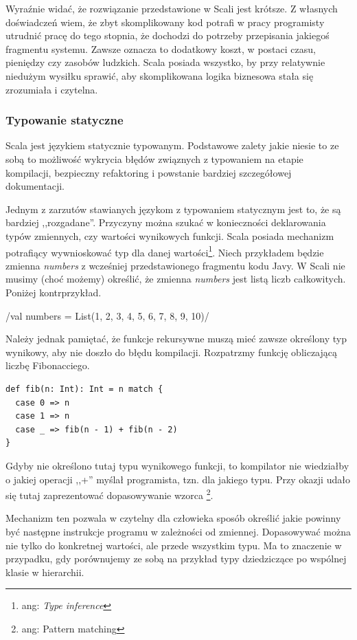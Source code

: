 \documentclass[brudnopis]{xmgr}
\begin{document}
Wyraźnie widać, że rozwiązanie przedstawione w Scali jest krótsze. Z własnych doświadczeń wiem, że zbyt skomplikowany kod potrafi w pracy programisty utrudnić pracę do tego stopnia, że dochodzi do potrzeby przepisania jakiegoś fragmentu systemu. Zawsze oznacza to dodatkowy koszt, w postaci czasu, pieniędzy czy zasobów ludzkich. Scala posiada wszystko, by przy relatywnie niedużym wysiłku sprawić, aby skomplikowana logika biznesowa stała się zrozumiała i czytelna.

\subsubsection{Typowanie statyczne}

Scala jest językiem statycznie typowanym. Podstawowe zalety jakie niesie to ze sobą to możliwość wykrycia błędów związnych z typowaniem na etapie kompilacji, bezpieczny refaktoring i powstanie bardziej szczegółowej dokumentacji. 

Jednym z zarzutów stawianych językom z typowaniem statycznym jest to, że są bardziej ,,rozgadane''. Przyczyny można szukać w konieczności deklarowania typów zmiennych, czy wartości wynikowych funkcji. Scala posiada mechanizm potrafiący wywnioskować typ dla danej wartości\footnote{ang: \emph{Type inference}}. Niech przykładem będzie zmienna \emph{numbers} z wcześniej przedstawionego fragmentu kodu Javy. W Scali nie musimy (choć możemy) określić, że zmienna \emph{numbers} jest listą liczb całkowitych. Poniżej kontrprzykład.

/val numbers = List(1, 2, 3, 4, 5, 6, 7, 8, 9, 10)/

Należy jednak pamiętać, że funkcje rekursywne muszą mieć zawsze określony typ wynikowy, aby nie doszło do błędu kompilacji. Rozpatrzmy funkcję obliczającą liczbę Fibonacciego.

\begin{verbatim}
def fib(n: Int): Int = n match {
  case 0 => n
  case 1 => n
  case _ => fib(n - 1) + fib(n - 2)
}
\end{verbatim}

Gdyby nie określono tutaj typu wynikowego funkcji, to kompilator nie wiedziałby o jakiej operacji ,,+'' myślał programista, tzn. dla jakiego typu. Przy okazji udało się tutaj zaprezentować dopasowywanie wzorca \footnote{ang: Pattern matching}.

Mechanizm ten pozwala w czytelny dla człowieka sposób określić jakie powinny być następne instrukcje programu w zależności od zmiennej. Dopasowywać można nie tylko do konkretnej wartości, ale przede wszystkim typu. Ma to znaczenie w przypadku, gdy porównujemy ze sobą na przykład typy dziedziczące po wspólnej klasie w hierarchii.
\end{document}
